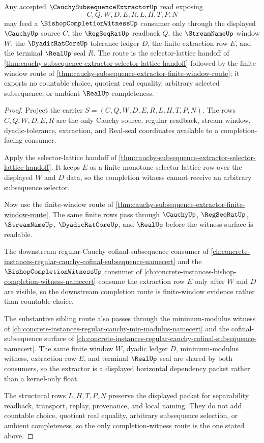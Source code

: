 \begin{theorem}
\label{thm:cauchy-subsequence-extractor-completion-witness-route}
Any accepted $\CauchySubsequenceExtractorUp$ read exposing
$$
C,Q,W,D,E,R,L,H,T,P,N
$$
may feed a $\BishopCompletionWitnessUp$ consumer only through the displayed $\CauchyUp$ source $C$, the $\RegSeqRatUp$ readback $Q$, the $\StreamNameUp$ window $W$, the $\DyadicRatCoreUp$ tolerance ledger $D$, the finite extraction row $E$, and the terminal $\RealUp$ seal $R$. The route is the selector-lattice handoff of \autoref{thm:cauchy-subsequence-extractor-selector-lattice-handoff} followed by the finite-window route of \autoref{thm:cauchy-subsequence-extractor-finite-window-route}; it exports no countable choice, quotient real equality, arbitrary selected subsequence, or ambient $\RealUp$ completeness.
\end{theorem}
\begin{proof}
Project the carrier $S=(C,Q,W,D,E,R,L,H,T,P,N)$. The rows $C,Q,W,D,E,R$ are the only Cauchy source, regular readback, stream-window, dyadic-tolerance, extraction, and Real-seal coordinates available to a completion-facing consumer.

Apply the selector-lattice handoff of \autoref{thm:cauchy-subsequence-extractor-selector-lattice-handoff}. It keeps $E$ as a finite monotone selector-lattice row over the displayed $W$ and $D$ data, so the completion witness cannot receive an arbitrary subsequence selector.

Now use the finite-window route of \autoref{thm:cauchy-subsequence-extractor-finite-window-route}. The same finite rows pass through $\CauchyUp$, $\RegSeqRatUp$, $\StreamNameUp$, $\DyadicRatCoreUp$, and $\RealUp$ before the witness surface is readable.

The downstream regular-Cauchy cofinal-subsequence consumer of \autoref{ch:concrete-instances-regular-cauchy-cofinal-subsequence-namecert} and the $\BishopCompletionWitnessUp$ consumer of \autoref{ch:concrete-instances-bishop-completion-witness-namecert} consume the extraction row $E$ only after $W$ and $D$ are visible, so the downstream completion route is finite-window evidence rather than countable choice.

The substantive sibling route also passes through the minimum-modulus witness of \autoref{ch:concrete-instances-regular-cauchy-min-modulus-namecert} and the cofinal-subsequence surface of \autoref{ch:concrete-instances-regular-cauchy-cofinal-subsequence-namecert}. The same finite window $W$, dyadic ledger $D$, minimum-modulus witness, extraction row $E$, and terminal $\RealUp$ seal are shared by both consumers, so the extractor is a displayed horizontal dependency packet rather than a kernel-only float.

The structural rows $L,H,T,P,N$ preserve the displayed packet for separability readback, transport, replay, provenance, and local naming. They do not add countable choice, quotient real equality, arbitrary subsequence selection, or ambient completeness, so the only completion-witness route is the one stated above.
\end{proof}

